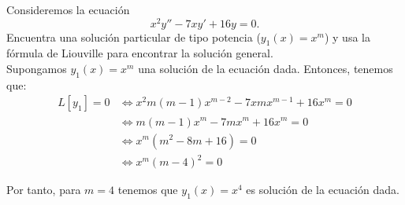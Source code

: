 \begin{ejercicio}\label{ej:4.5}
    Consideremos la ecuación
    \[
        x^2 y'' - 7xy' + 16y = 0.
    \]
    Encuentra una solución particular de tipo potencia ($y_1(x) = x^m$) y usa la fórmula de Liouville para encontrar la solución general.\\

    Supongamos $y_1(x)=x^m$ una solución de la ecuación dada. Entonces, tenemos que:
    \begin{align*}
        L[y_1]=0 & \Longleftrightarrow x^2m(m-1)x^{m-2}-7xm x^{m-1}+16x^m=0\\
        & \Longleftrightarrow m(m-1)x^m-7mx^m+16x^m=0\\
        & \Longleftrightarrow x^m(m^2-8m+16)=0\\
        & \Longleftrightarrow x^m(m-4)^2=0
    \end{align*}

    Por tanto, para $m=4$ tenemos que $y_1(x)=x^4$ es solución de la ecuación dada.
\end{ejercicio}

